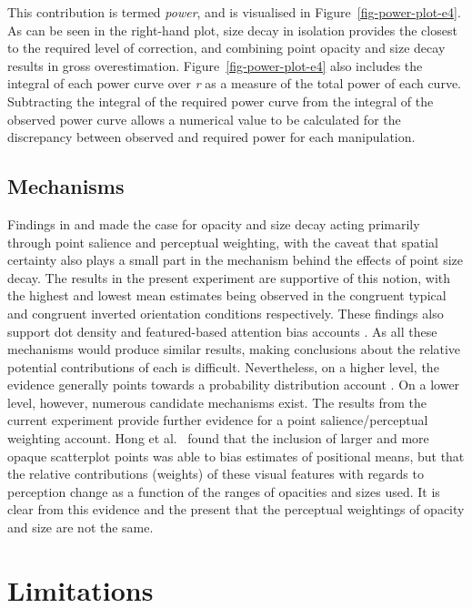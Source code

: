 \documentclass[../main.tex]{subfiles}
\begin{document}
This contribution is termed \emph{power}, and is visualised in
Figure~\ref{fig-power-plot-e4}. As can be seen in the right-hand plot,
size decay in isolation provides the closest to the required level of
correction, and combining point opacity and size decay results in gross
overestimation. Figure~\ref{fig-power-plot-e4} also includes the
integral of each power curve over \emph{r} as a measure of the total
power of each curve. Subtracting the integral of the required power
curve from the integral of the observed power curve allows a numerical
value to be calculated for the discrepancy between observed and required
power for each manipulation.

\subsection{Mechanisms}\label{mechanisms}

Findings in  and 
made the case for opacity and size decay acting primarily through point
salience and perceptual weighting, with the caveat that spatial
certainty also plays a small part in the mechanism behind the effects of
point size decay. The results in the present experiment are supportive
of this notion, with the highest and lowest mean estimates being
observed in the congruent typical and congruent inverted orientation
conditions respectively. These findings also support dot density
\cite{yang_2023} and featured-based attention bias accounts
\cite{hong_2022, sun_2016}. As all these mechanisms would produce
similar results, making conclusions about the relative potential
contributions of each is difficult. Nevertheless, on a higher level, the
evidence generally points towards a probability distribution account
\cite{rensink_2017, rensink_2022}. On a lower level, however, numerous
candidate mechanisms exist. The results from the current experiment
provide further evidence for a point salience/perceptual weighting
account. Hong et al.~\cite{hong_2022} found that the inclusion of larger
and more opaque scatterplot points was able to bias estimates of
positional means, but that the relative contributions (weights) of these
visual features with regards to perception change as a function of the
ranges of opacities and sizes used. It is clear from this evidence and
the present that the perceptual weightings of opacity and size are not
the same.

\section{Limitations}\label{limitations-e4}
\end{document}
